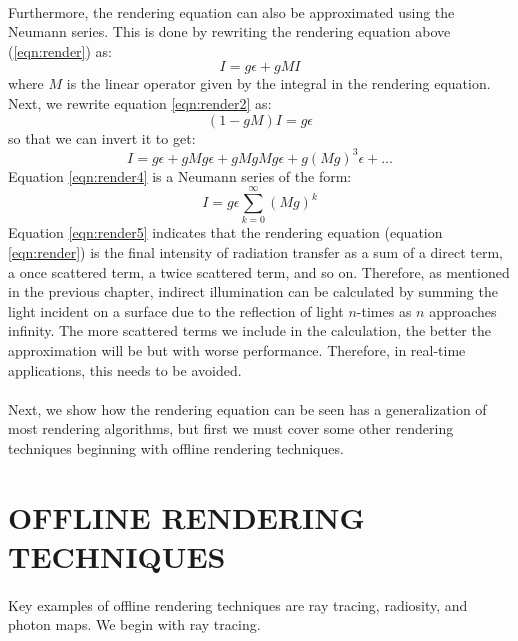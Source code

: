 \paragraph{}
Furthermore, the rendering equation can also be approximated using the Neumann series.  This is done by rewriting the rendering equation above (\ref{eqn:render}) as:
\begin{equation}
I = g\epsilon +gMI \label{eqn:render2}
\end{equation}
where $M$ is the linear operator given by the integral in the rendering equation.  Next, we rewrite equation \ref{eqn:render2} as:
\begin{equation}
(1-gM)I = g\epsilon \label{eqn:render3}
\end{equation}
so that we can invert it to get:
\begin{equation}
I = g\epsilon + gMg\epsilon + gMgMg\epsilon +g(Mg)^3\epsilon + ... \label{eqn:render4}
\end{equation}
Equation \ref{eqn:render4} is a Neumann series of the form:
\begin{equation}
I = g\epsilon\sum_{k=0}^{\infty}(Mg)^k \label{eqn:render5}
\end{equation}
Equation \ref{eqn:render5} indicates that the rendering equation (equation \ref{eqn:render}) is the final intensity of radiation transfer as a sum of a direct term, a once scattered term, a twice scattered term, and so on.  Therefore, as mentioned in the previous chapter, indirect illumination can be calculated by summing the light incident on a surface due to the reflection of light $n$-times as $n$ approaches infinity.  The more scattered terms we include in the calculation, the better the approximation will be but with worse performance.  Therefore, in real-time applications, this needs to be avoided.  

\paragraph{}
Next, we show how the rendering equation can be seen has a generalization of most rendering algorithms, but first we must cover some other rendering techniques beginning with offline rendering techniques.

\section{OFFLINE RENDERING TECHNIQUES}
\paragraph{}
Key examples of offline rendering techniques are ray tracing, radiosity, and photon maps.  We begin with ray tracing.

